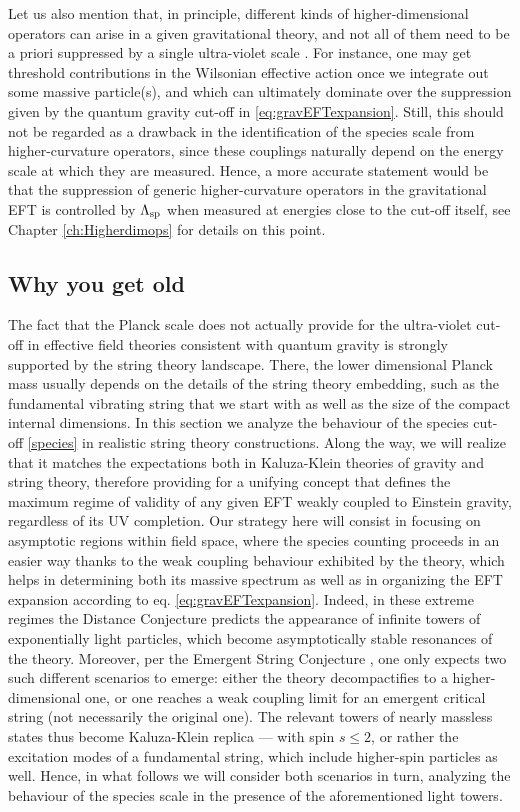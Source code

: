 Let us also mention that, in principle, different kinds of higher-dimensional operators can arise in a given gravitational theory, and not all of them need to be a priori suppressed by a single ultra-violet scale \cite{Donoghue:1995cz}. For instance, one may get threshold contributions in the Wilsonian effective action once we integrate out some massive particle(s), and which can ultimately dominate over the suppression given by the quantum gravity cut-off in \eqref{eq:gravEFTexpansion}. Still, this should not be regarded as a drawback in the identification of the species scale from higher-curvature operators, since these couplings naturally depend on the energy scale at which they are measured. Hence, a more accurate statement would be that the suppression of generic higher-curvature operators in the gravitational EFT is controlled by $\Lambda_{\text{sp}}$ when measured at energies close to the cut-off itself, see Chapter \ref{ch:Higherdimops} for details on this point.
	

\subsection{Why you get old}
\label{ss:Planck&string}

The fact that the Planck scale does not actually provide for the ultra-violet cut-off in effective field theories consistent with quantum gravity is strongly supported by the string theory landscape. There, the lower dimensional Planck mass usually depends on the details of the string theory embedding, such as the fundamental vibrating string that we start with as well as the size of the compact internal dimensions. In this section we analyze the behaviour of the species cut-off \eqref{species} in realistic string theory constructions. Along the way, we will realize that it matches the expectations both in Kaluza-Klein theories of gravity and string theory, therefore providing for a unifying concept that defines the maximum regime of validity of any given EFT weakly coupled to Einstein gravity, regardless of its UV completion. Our strategy here will consist in focusing on asymptotic regions within field space, where the species counting proceeds in an easier way thanks to the weak coupling behaviour exhibited by the theory, which helps in determining both its massive spectrum as well as in organizing the EFT expansion according to eq. \eqref{eq:gravEFTexpansion}. Indeed, in these extreme regimes the Distance Conjecture \cite{Ooguri:2006in} predicts the appearance of infinite towers of exponentially light particles, which become asymptotically stable resonances of the theory. Moreover, per the Emergent String Conjecture \cite{Lee:2019wij}, one only expects two such different scenarios to emerge: either the theory decompactifies to a higher-dimensional one, or one reaches a weak coupling limit for an emergent critical string (not necessarily the original one). The relevant towers of nearly massless states thus become Kaluza-Klein replica --- with spin $s \leq 2$, or rather the excitation modes of a fundamental string, which include higher-spin particles as well. Hence, in what follows we will consider both scenarios in turn, analyzing the behaviour of the species scale in the presence of the aforementioned light towers.
	
